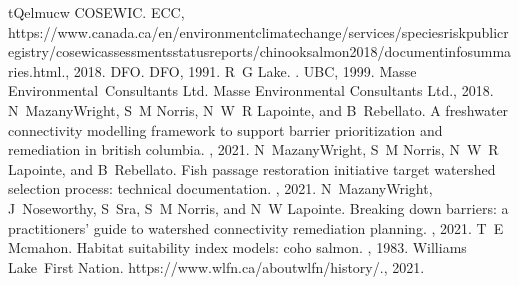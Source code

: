 \documentclass[letterpaper,10pt,english]{jupyterBook}
\begin{document}
\begin{sphinxthebibliography}{tQelmucw}
\sphinxAtStartPar
COSEWIC.  ECC, https://www.canada.ca/en/environment\sphinxhyphen{}climate\sphinxhyphen{}change/services/species\sphinxhyphen{}risk\sphinxhyphen{}public\sphinxhyphen{}registry/cosewic\sphinxhyphen{}assessments\sphinxhyphen{}status\sphinxhyphen{}reports/chinook\sphinxhyphen{}salmon\sphinxhyphen{}2018/document\sphinxhyphen{}info\sphinxhyphen{}summaries.html., 2018.
\sphinxAtStartPar
DFO.  DFO, 1991.
\sphinxAtStartPar
R G Lake. . UBC, 1999.
\sphinxAtStartPar
Masse Environmental Consultants Ltd.  Masse Environmental Consultants Ltd., 2018.
\sphinxAtStartPar
N Mazany\sphinxhyphen{}Wright, S M Norris, N W R Lapointe, and B Rebellato. A freshwater connectivity modelling framework to support barrier prioritization and remediation in british columbia. , 2021.
\sphinxAtStartPar
N Mazany\sphinxhyphen{}Wright, S M Norris, N W R Lapointe, and B Rebellato. Fish passage restoration initiative target watershed selection process: technical documentation. , 2021.
\sphinxAtStartPar
N Mazany\sphinxhyphen{}Wright, J Noseworthy, S Sra, S M Norris, and N W Lapointe. Breaking down barriers: a practitioners' guide to watershed connectivity remediation planning. , 2021.
\sphinxAtStartPar
T E Mcmahon. Habitat suitability index models: coho salmon. , 1983.
\sphinxAtStartPar
Williams Lake First Nation.  https://www.wlfn.ca/about\sphinxhyphen{}wlfn/history/., 2021.

\end{sphinxthebibliography}
\end{document}

